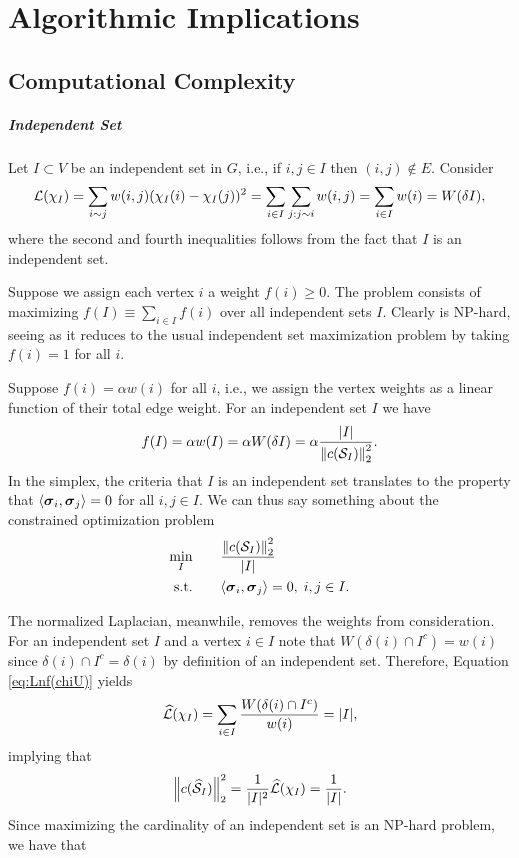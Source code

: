 \chapter{Algorithmic Implications}

\section{Computational Complexity}

\paragraph{Independent Set}
Let $I\subset V$ be an independent set in $G$, i.e., if $i,j\in I$ then $(i,j)\notin E$. Consider 
\begin{align*}
    \mathcal{L}(\chi_I) = \sum_{i\sim j}w(i,j)(\chi_I(i)-\chi_I(j))^2 = \sum_{i\in I}\sum_{j:j\sim i} w(i,j) = \sum_{i\in I}w(i)=W(\delta I),
\end{align*}
where the second and fourth inequalities follows from the fact that $I$ is an independent set. 

Suppose we assign each vertex $i$ a weight $f(i)\geq 0$. The \mwis problem consists of maximizing $f(I)\equiv \sum_{i\in I}f(i)$ over all independent sets $I$. Clearly \mwis is NP-hard, seeing as it reduces to the usual independent set maximization problem by taking $f(i)=1$ for all $i$. 

Suppose $f(i)=\alpha w(i)$ for all $i$, i.e., we assign the vertex weights as a linear function of their total edge weight. For an independent set $I$ we have 
\begin{align*}
    f(I) = \alpha w(I)= \alpha W(\delta I) = \alpha \frac{|I|}{\norm{c(\mathcal{S}_I)}_2^2}.
\end{align*}
In the simplex, the criteria that $I$ is an independent set translates to the property that $\langle \vb*{\sigma}_i,\vb*{\sigma}_j\rangle =0$ for all $i,j\in I$. We can thus say something \TODO {} about the constrained optimization problem 
\begin{alignat*}{2}
    \min_I & \quad && \frac{\norm{c(\mathcal{S}_I)}_2^2}{|I|} \\
    \text{s.t.} & && \langle \vb*{\sigma}_i,\vb*{\sigma}_j\rangle =0, \;i,j\in I.
\end{alignat*}

The normalized Laplacian, meanwhile, removes the weights from consideration. For an independent set $I$ and a vertex $i\in I$ note that $W(\delta(i)\cap I^c)=w(i)$ since $\delta(i)\cap I^c=\delta(i)$ by definition of an independent set. Therefore, Equation \eqref{eq:Lnf(chiU)} yields 
\begin{align*}
    \widehat{\mathcal{L}}(\chi_I)=\sum_{i\in I}\frac{W(\delta(i)\cap I^c)}{w(i)} = |I|,
\end{align*}
implying that 
\[\norm{c(\widehat{\mathcal{S}}_I)}_2^2=\frac{1}{|I|^2}\widehat{\mathcal{L}}(\chi_I)=\frac{1}{|I|}.\]
Since maximizing the cardinality of an independent set is an NP-hard problem, we have that 

